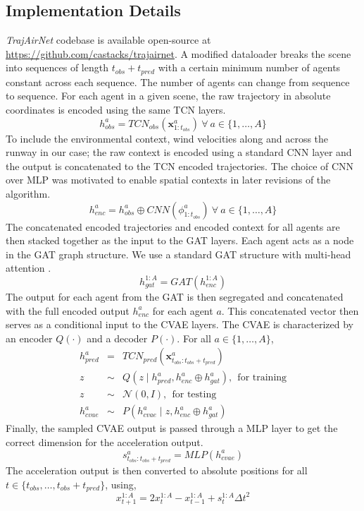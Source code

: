 \documentclass[letterpaper, 10 pt, conference]{ieeeconf}
\begin{document}
\subsection{Implementation Details}\label{sec:implement}
\textit{TrajAirNet} codebase is available open-source at \href{https://github.com/castacks/trajairnet}{https://github.com/castacks/trajairnet}. A modified dataloader breaks the scene into sequences of length $t_{obs}+t_{pred}$ with a certain minimum number of agents constant across each sequence. The number of agents can change from sequence to sequence. For each agent in a given scene, the raw trajectory in absolute coordinates is encoded using the same TCN layers. 
\begin{equation}
    h_{obs}^a = TCN_{obs} (\mathbf{{x}}^{a}_{1:t_{obs}}) ~ \forall~ a\in \{1,\dots,A\} 
\end{equation}
To include the environmental context, wind velocities along and across the runway in our case; the raw context is encoded using a standard CNN layer and the output is concatenated to the TCN encoded trajectories. The choice of CNN over MLP was motivated to enable spatial contexts in later revisions of the algorithm.  
\begin{equation}
    h_{enc}^a = h_{obs}^a\oplus CNN(\phi^{a}_{1:t_{obs}}) ~ \forall~ a\in \{1,\dots,A\} 
\end{equation}
The concatenated encoded trajectories and encoded context for all agents are then stacked together as the input to the GAT layers. Each agent acts as a node in the GAT graph structure. We use a standard GAT structure with multi-head attention \cite{velivckovic2017graph}.  
\begin{equation}
    h_{gat}^{1:A} = GAT(h_{enc}^{1:A})  
\end{equation}
The output for each agent from the GAT is then segregated and concatenated with the full encoded output $h_{enc}^a$ for each agent $a$. This concatenated vector then serves as a conditional input to the CVAE layers. The CVAE is characterized by an encoder $Q(\cdot)$ and a  decoder $P(\cdot)$. For all $a \in \{1,\dots,A\} $,
\begin{eqnarray}
h_{pred}^a &=& TCN_{pred} (\mathbf{x}^{a}_{t_{obs}:t_{obs}+t_{pred}}) \nonumber \\ 
z &\sim& Q(z \mid h_{pred}^a, h_{enc}^a \oplus h_{gat}^a), ~~ \text{for training} \nonumber \\
z &\sim& \mathcal{N}(0,I),  ~~\text{for testing} \\
h_{cvae}^a &\sim& P(h_{cvae}^a \mid z, h_{enc}^a \oplus h_{gat}^a) \nonumber
\end{eqnarray}
Finally, the sampled CVAE output is passed through a MLP layer to get the correct dimension for the acceleration output. 
\begin{equation}
    s^a_{t_{obs}:t_{obs}+t_{pred}} = MLP(h_{cvae}^a)
\end{equation}
The acceleration output is then converted to absolute positions for all $t \in \{t_{obs},\dots, t_{obs}+t_{pred}\}$, using, 
\begin{equation}
x^{1:A}_{t+1} = 2x^{1:A}_{t} -   x^{1:A}_{t-1} + s_{t}^{1:A}\Delta t^2  
\end{equation}
\end{document}

